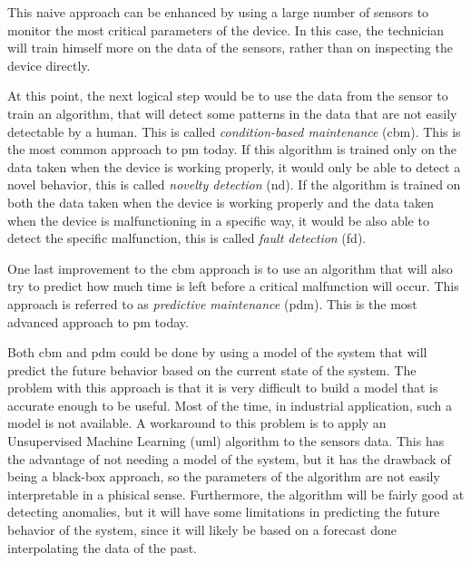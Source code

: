 This naive approach can be enhanced by using a large number of sensors to monitor the most critical parameters of the device. In this case, the technician will train himself more on the data of the sensors, rather than on inspecting the device directly. 

At this point, the next logical step would be to use the data from the sensor to train an algorithm, that will detect some patterns in the data that are not easily detectable by a human. This is called \emph{condition-based maintenance} (\gls{cbm}). This is the most common approach to \gls{pm} today. If this algorithm is trained only on the data taken when the device is working properly, it would only be able to detect a novel behavior, this is called \emph{novelty detection} (\gls{nd}). If the algorithm is trained on both the data taken when the device is working properly and the data taken when the device is malfunctioning in a specific way, it would be also able to detect the specific malfunction, this is called \emph{fault detection} (\gls{fd}).

One last improvement to the \gls{cbm} approach is to use an algorithm that will also try to predict how much time is left before a critical malfunction will occur. This approach is referred to as \emph{predictive maintenance} (\gls{pdm}). This is the most advanced approach to \gls{pm} today.

Both \gls{cbm} and \gls{pdm} could be done by using a model of the system that will predict the future behavior based on the current state of the system. The problem with this approach is that it is very difficult to build a model that is accurate enough to be useful. Most of the time, in industrial application, such a model is not available.
A workaround to this problem is to apply an Unsupervised Machine Learning (\gls{uml}) algorithm to the sensors data. This has the advantage of not needing a model of the system, but it has the drawback of being a black-box approach, so the parameters of the algorithm are not easily interpretable in a phisical sense. Furthermore, the algorithm will be fairly good at detecting anomalies, but it will have some limitations in predicting the future behavior of the system, since it will likely be based on a forecast done interpolating the data of the past.

